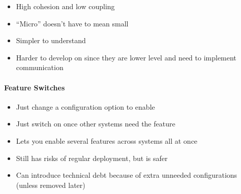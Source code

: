 \begin{itemize}
	\item High cohesion and low coupling
	\item ``Micro'' doesn't have to mean small
	\item Simpler to understand
	\item Harder to develop on since they are lower level and need to implement communication
\end{itemize}

\paragraph{Feature Switches}\label{par:feature_switches}

\begin{itemize}
	\item Just change a configuration option to enable
	\item Just switch on once other systems need the feature
	\item Lets you enable several features across systems all at once
	\item Still has risks of regular deployment, but is safer
	\item Can introduce technical debt because of extra unneeded configurations (unless removed later)
\end{itemize}

